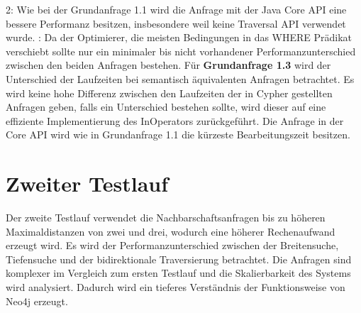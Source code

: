  2: Wie bei der Grundanfrage 1.1 wird   die Anfrage mit der Java Core API eine bessere Performanz besitzen, insbesondere weil keine Traversal API verwendet wurde. : Da der Optimierer, die meisten Bedingungen in das WHERE Prädikat verschiebt sollte nur ein minimaler bis nicht vorhandener Performanzunterschied zwischen den beiden Anfragen bestehen. \newline \newline
Für \textbf{Grundanfrage 1.3} wird der Unterschied der Laufzeiten bei semantisch äquivalenten Anfragen betrachtet. \newline
Es wird keine hohe Differenz zwischen den Laufzeiten der in Cypher gestellten Anfragen geben, falls ein Unterschied bestehen sollte, wird dieser auf eine effiziente Implementierung des InOperators zurückgeführt. Die Anfrage in der Core API wird wie in Grundanfrage 1.1 die kürzeste Bearbeitungszeit besitzen.

\section{Zweiter Testlauf}
Der zweite Testlauf verwendet die Nachbarschaftsanfragen bis zu höheren Maximaldistanzen von zwei und drei, wodurch eine höherer Rechenaufwand erzeugt wird. Es wird der Performanzunterschied zwischen der Breitensuche, Tiefensuche und der bidirektionale Traversierung betrachtet. Die Anfragen sind komplexer im Vergleich zum ersten Testlauf und die Skalierbarkeit des Systems wird analysiert. Dadurch wird ein tieferes Verständnis der Funktionsweise von Neo4j erzeugt. 
